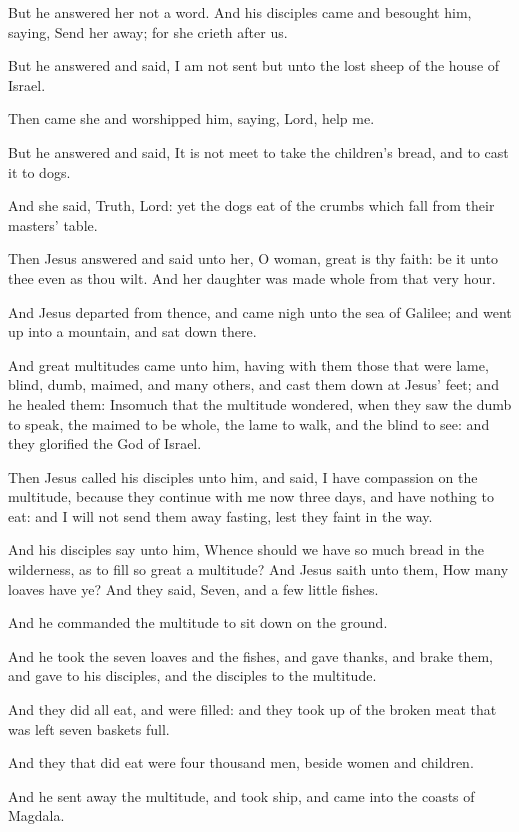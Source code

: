 \verse But he answered her not a word. And his disciples came and besought him, saying, Send her away; for she crieth after us.

\verse But he answered and said, I am not sent but unto the lost sheep of the house of Israel.

\verse Then came she and worshipped him, saying, Lord, help me.

\verse But he answered and said, It is not meet to take the children's bread, and to cast it to dogs.

\verse And she said, Truth, Lord: yet the dogs eat of the crumbs which fall from their masters' table.

\verse Then Jesus answered and said unto her, O woman, great is thy faith: be it unto thee even as thou wilt. And her daughter was made whole from that very hour.

\verse And Jesus departed from thence, and came nigh unto the sea of Galilee; and went up into a mountain, and sat down there.

\verse And great multitudes came unto him, having with them those that were lame, blind, dumb, maimed, and many others, and cast them down at Jesus' feet; and he healed them: \verse Insomuch that the multitude wondered, when they saw the dumb to speak, the maimed to be whole, the lame to walk, and the blind to see: and they glorified the God of Israel.

\verse Then Jesus called his disciples unto him, and said, I have compassion on the multitude, because they continue with me now three days, and have nothing to eat: and I will not send them away fasting, lest they faint in the way.

\verse And his disciples say unto him, Whence should we have so much bread in the wilderness, as to fill so great a multitude?  \verse And Jesus saith unto them, How many loaves have ye? And they said, Seven, and a few little fishes.

\verse And he commanded the multitude to sit down on the ground.

\verse And he took the seven loaves and the fishes, and gave thanks, and brake them, and gave to his disciples, and the disciples to the multitude.

\verse And they did all eat, and were filled: and they took up of the broken meat that was left seven baskets full.

\verse And they that did eat were four thousand men, beside women and children.

\verse And he sent away the multitude, and took ship, and came into the coasts of Magdala.


